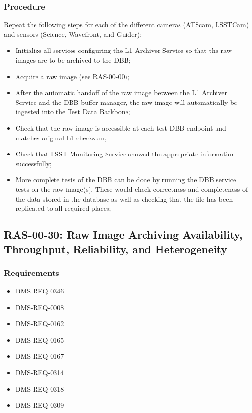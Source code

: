 \documentclass[DM,lsstdraft,STS,toc]{lsstdoc}
\begin{document}
\subsubsection{Procedure}
Repeat the following steps for each of the different cameras (ATScam, LSSTCam) and sensors (Science, Wavefront, and Guider):
\begin{itemize}
\item{Initialize all services configuring the L1 Archiver Service so that the raw images are to be archived to the DBB;}
\item{Acquire a raw image (see \hyperref[ras-00-00]{RAS-00-00});}
\item{After the automatic handoff of the raw image between the L1 Archiver Service and the DBB buffer manager, the raw
image will automatically be ingested into the Test Data Backbone;}
\item{Check that the raw image is accessible at each test DBB endpoint and matches original L1 checksum;}
\item{Check that LSST Monitoring Service showed the appropriate information successfully;}
\item{More complete tests of the DBB can be done by running the DBB
service tests on the raw image(s). These would check correctness
and completeness of the data stored in the database as well as
checking that the file has been replicated to all required places;}
\end{itemize}


\subsection{RAS-00-30: Raw Image Archiving Availability, Throughput, Reliability, and Heterogeneity}
\label{ras-00-30}

\subsubsection{Requirements}
\begin{itemize}
\item{DMS-REQ-0346}
\item{DMS-REQ-0008}
\item{DMS-REQ-0162}
\item{DMS-REQ-0165}
\item{DMS-REQ-0167}
\item{DMS-REQ-0314}
\item{DMS-REQ-0318}
\item{DMS-REQ-0309}
\end{itemize}
\end{document}
